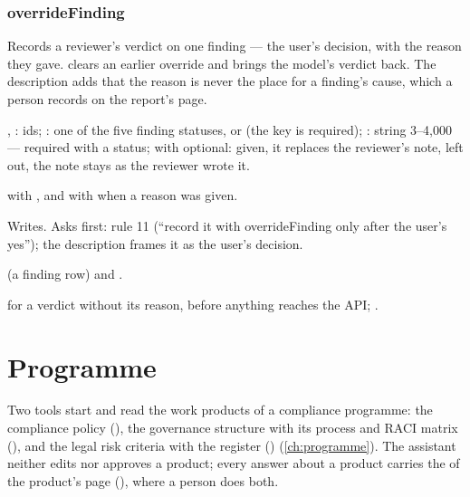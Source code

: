 \subsubsection{overrideFinding}\label{sec:tools:overrideFinding}
\begin{description}[style=multiline, leftmargin=19mm, labelwidth=17mm, labelsep=2mm,
  font=\sffamily\bfseries\footnotesize\color{ink}, itemsep=1pt, topsep=2pt, before=\raggedright]
  \item[Does] Records a reviewer's verdict on one finding --- the user's decision, with the
    reason they gave.  clears an earlier override and brings the model's verdict
    back. The description adds that the reason is never the place for a finding's cause, which
    a person records on the report's page.
  \item[Input] , : ids; : one of the five finding
    statuses, or  (the key is required); : string 3--4,000 ---
    required with a status; with  optional: given, it replaces the reviewer's
    note, left out, the note stays as the reviewer wrote it.
  \item[Calls]  with , and
    with  when a reason was given.
  \item[Kind] Writes. Asks first: rule 11 (\enquote{record it with overrideFinding only after
    the user's yes}); the description frames it as the user's decision.
  \item[Returns]  (a finding row) and .
  \item[Errors]  for a verdict without its reason, before anything
    reaches the API; .
\end{description}


\section{Programme}\label{sec:tools:programme}

Two tools start and read the work products of a compliance programme: the compliance policy
(), the governance structure with its process and RACI matrix
(), and the legal risk criteria with the register ()
(\cref{ch:programme}). The assistant neither edits nor approves a product; every answer about
a product carries the  of the product's page (), where a person does both.

